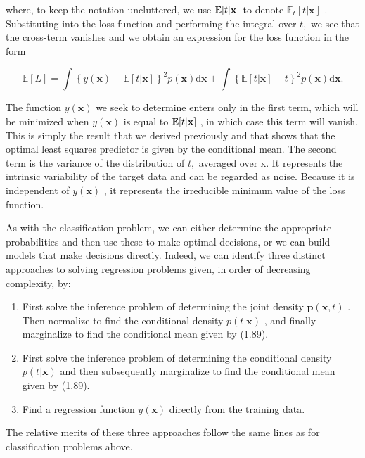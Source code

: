 \documentclass[
  10
]{article}
\begin{document}
where, to keep the notation uncluttered, we use
\(\mathbb { E } [ t | { \bf x } ]\) to denote
\(\mathbb { E } _ { t } [ t | \mathbf { x } ]\) . Substituting into the
loss function and performing the integral over \(t ,\) we see that the
cross-term vanishes and we obtain an expression for the loss function in
the form

\[
\mathbb {E} [ L ] = \int \left\{y (\mathbf {x}) - \mathbb {E} [ t | \mathbf {x} ] \right\} ^ {2} p (\mathbf {x}) \mathrm{d} \mathbf {x} + \int \left\{\mathbb {E} [ t | \mathbf {x} ] - t \right\} ^ {2} p (\mathbf {x}) \mathrm{d} \mathbf {x}.\tag{1.90}
\]

The function \(y ( \mathbf x )\) we seek to determine enters only in the
first term, which will be minimized when \(y ( \mathbf x )\) is equal to
\(\mathbb { E } [ t | { \bf x } ]\) , in which case this term will
vanish. This is simply the result that we derived previously and that
shows that the optimal least squares predictor is given by the
conditional mean. The second term is the variance of the distribution of
\(t ,\) averaged over x. It represents the intrinsic variability of the
target data and can be regarded as noise. Because it is independent of
\(y ( \mathbf x )\) , it represents the irreducible minimum value of the
loss function.

As with the classification problem, we can either determine the
appropriate probabilities and then use these to make optimal decisions,
or we can build models that make decisions directly. Indeed, we can
identify three distinct approaches to solving regression problems given,
in order of decreasing complexity, by:

\begin{enumerate}
\def\labelenumi{(\alph{enumi})}
\item
  First solve the inference problem of determining the joint density
  \(\boldsymbol { p } ( \mathbf { x } , t )\) . Then normalize to find
  the conditional density \(p ( t | \mathbf { x } )\) , and finally
  marginalize to find the conditional mean given by (1.89).
\item
  First solve the inference problem of determining the conditional
  density \(p ( t | \mathbf { x } )\) and then subsequently marginalize
  to find the conditional mean given by (1.89).
\item
  Find a regression function \(y ( \mathbf x )\) directly from the
  training data.
\end{enumerate}

The relative merits of these three approaches follow the same lines as
for classification problems above.
\end{document}
